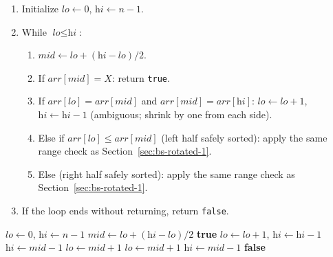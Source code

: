 \begin{enumerate}
  \item Initialize $\textit{lo} \gets 0$, $\textit{hi} \gets n-1$.
  \item While $\textit{lo} \le \textit{hi}$:
  \begin{enumerate}
    \item $\textit{mid} \gets \textit{lo}+(\textit{hi}-\textit{lo})/2$.
    \item If $\textit{arr}[\textit{mid}] = X$: return \texttt{true}.
    \item If $\textit{arr}[\textit{lo}] = \textit{arr}[\textit{mid}]$ and
          $\textit{arr}[\textit{mid}] = \textit{arr}[\textit{hi}]$:
          $\textit{lo} \gets \textit{lo}+1$, $\textit{hi} \gets
          \textit{hi}-1$ (ambiguous; shrink by one from each side).
    \item Else if $\textit{arr}[\textit{lo}] \le \textit{arr}[\textit{mid}]$
          (left half safely sorted): apply the same range check as
          Section~\ref{sec:bs-rotated-1}.
    \item Else (right half safely sorted): apply the same range check as
          Section~\ref{sec:bs-rotated-1}.
  \end{enumerate}
  \item If the loop ends without returning, return \texttt{false}.
\end{enumerate}

\begin{algorithm}[H]
\caption{Search in Rotated Sorted Array (With Duplicates)}
\begin{algorithmic}[1]
  \State $\textit{lo} \gets 0$, $\textit{hi} \gets n-1$
    \State $\textit{mid} \gets \textit{lo}+(\textit{hi}-\textit{lo})/2$
     \Return \textbf{true} \EndIf
      \State $\textit{lo} \gets \textit{lo}+1$, $\textit{hi} \gets \textit{hi}-1$
        \State $\textit{hi} \gets \textit{mid} - 1$
      \Else
        \State $\textit{lo} \gets \textit{mid} + 1$
      \EndIf
    \Else
        \State $\textit{lo} \gets \textit{mid} + 1$
      \Else
        \State $\textit{hi} \gets \textit{mid} - 1$
      \EndIf
    \EndIf
  \EndWhile
  \State \Return \textbf{false}
\EndProcedure
\end{algorithmic}
\end{algorithm}

